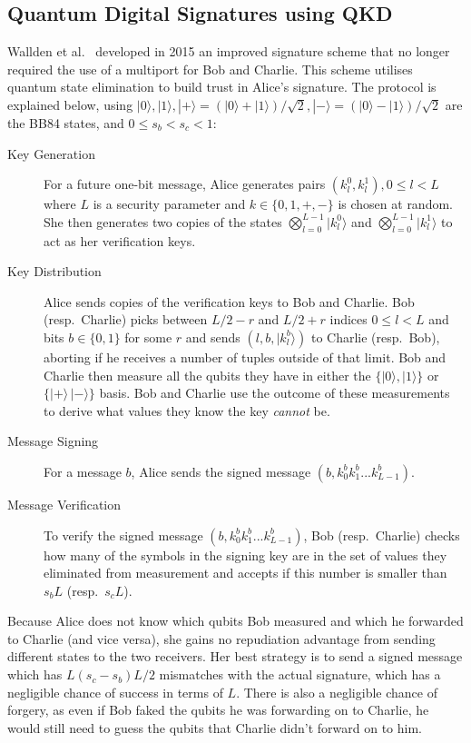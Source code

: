 \documentclass[%
 reprint,
 amsmath,amssymb,
 aps,
 pra,
]{revtex4-1}
\begin{document}
\subsection{Quantum Digital Signatures using QKD}

Wallden et al.\ \cite{PhysRevA.91.042304} developed in 2015 an improved signature scheme that no longer required the use of a multiport for Bob and Charlie. This scheme utilises quantum state elimination \cite{PhysRevA.89.022336} to build trust in Alice's signature. The protocol is explained below, using $|0\rangle, |1\rangle, |+\rangle = (|0\rangle + |1\rangle)/\sqrt{2}, |-\rangle = (|0\rangle - |1\rangle)/\sqrt{2}$ are the BB84 \cite{BB84} states, and $0 \leq s_b < s_c < 1$:

\begin{description}
\item[Key Generation]For a future one-bit message, Alice generates pairs $(k^0_l, k^1_l), 0 \leq l < L$ where $L$ is a security parameter and $k \in \{0, 1, +, -\}$ is chosen at random. She then generates two copies of the states $\bigotimes_{l=0}^{L-1}|k^0_l\rangle$ and $\bigotimes_{l=0}^{L-1}|k^1_l\rangle$ to act as her verification keys.
\item[Key Distribution]Alice sends copies of the verification keys to Bob and Charlie. Bob (resp.\ Charlie) picks between $L/2-r$ and $L/2+r$ indices $0 \leq l < L$ and bits $b \in \{0, 1\}$ for some $r$ and sends $(l, b, |k^b_l\rangle)$ to Charlie (resp.\ Bob), aborting if he receives a number of tuples outside of that limit. Bob and Charlie then measure all the qubits they have in either the $\{|0\rangle, |1\rangle\}$ or $\{|+\rangle\, |-\rangle\}$ basis. Bob and Charlie use the outcome of these measurements to derive what values they know the key \textit{cannot} be.
\item[Message Signing]For a message $b$, Alice sends the signed message $(b, k^b_0k^b_1...k^b_{L-1})$.
\item[Message Verification]To verify the signed message $(b, k^b_0k^b_1...k^b_{L-1})$, Bob (resp.\ Charlie) checks how many of the symbols in the signing key are in the set of values they eliminated from measurement and accepts if this number is smaller than $s_bL$ (resp.\ $s_cL$).
\end{description}

Because Alice does not know which qubits Bob measured and which he forwarded to Charlie (and vice versa), she gains no repudiation advantage from sending different states to the two receivers. Her best strategy is to send a signed message which has $L(s_c - s_b)L/2$ mismatches with the actual signature, which has a negligible chance of success in terms of $L$. There is also a negligible chance of forgery, as even if Bob faked the qubits he was forwarding on to Charlie, he would still need to guess the qubits that Charlie didn't forward on to him.
\end{document}
